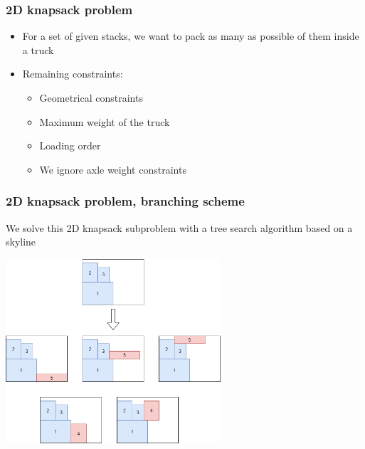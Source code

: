 \documentclass[10pt]{beamer}
\begin{document}
\begin{frame}
  \frametitle{2D knapsack problem}

  \begin{itemize}
    \item For a set of given stacks, we want to pack as many as possible of them inside a truck
    \item Remaining constraints:
      \begin{itemize}
        \item Geometrical constraints
        \item Maximum weight of the truck
        \item Loading order
        \item We ignore axle weight constraints
      \end{itemize}
  \end{itemize}
\end{frame}

\begin{frame}
  \frametitle{2D knapsack problem, branching scheme}

  We solve this 2D knapsack subproblem with a tree search algorithm based on a skyline

  \begin{center}
    \includegraphics[width=0.6\textwidth]{img/branching_scheme_2d.png}
  \end{center}
\end{frame}
\end{document}

